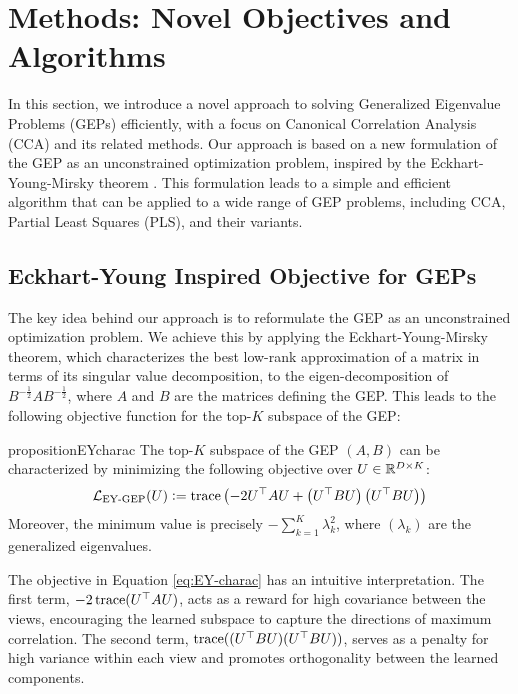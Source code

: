 \section{Methods: Novel Objectives and Algorithms}\label{sec:contributions}
In this section, we introduce a novel approach to solving Generalized Eigenvalue Problems (GEPs) efficiently, with a focus on Canonical Correlation Analysis (CCA) and its related methods. Our approach is based on a new formulation of the GEP as an unconstrained optimization problem, inspired by the Eckhart-Young-Mirsky theorem \citep{stewart_matrix_1990}. This formulation leads to a simple and efficient algorithm that can be applied to a wide range of GEP problems, including CCA, Partial Least Squares (PLS), and their variants.

\subsection{Eckhart-Young Inspired Objective for GEPs}
The key idea behind our approach is to reformulate the GEP as an unconstrained optimization problem. We achieve this by applying the Eckhart-Young-Mirsky theorem, which characterizes the best low-rank approximation of a matrix in terms of its singular value decomposition, to the eigen-decomposition of $B^{-\frac{1}{2}} A B^{-\frac{1}{2}}$, where $A$ and $B$ are the matrices defining the GEP.
This leads to the following objective function for the top-$K$ subspace of the GEP:
\begin{restatable}{proposition}{EYcharac}
\label{prop:EY-charac}
The top-$K$ subspace of the GEP $(A,B)$ can be characterized by minimizing the following objective over $U \in \mathbb{R}^{D \times K}$:
\begin{align}\label{eq:EY-charac}
\mathcal{L}_\text{EY-GEP}(U) \vcentcolon= \operatorname{trace} \left( - 2U^\top A U + \left(U^\top B U\right) \left(U^\top B U\right) \right)
\end{align}
Moreover, the minimum value is precisely $- \sum_{k=1}^K \lambda_k^2$, where $(\lambda_k)$ are the generalized eigenvalues.
\end{restatable}
The objective in Equation \eqref{eq:EY-charac} has an intuitive interpretation. The first term, $-2 \operatorname{trace}(U^\top A U)$, acts as a reward for high covariance between the views, encouraging the learned subspace to capture the directions of maximum correlation.
The second term, $\operatorname{trace}((U^\top B U)(U^\top B U))$, serves as a penalty for high variance within each view and promotes orthogonality between the learned components.

